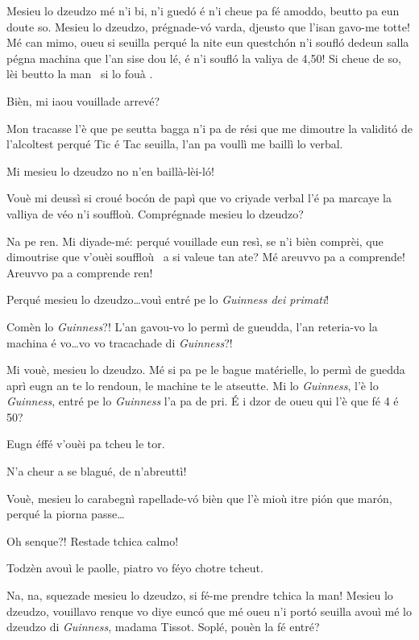 \begin{drama}
\Cienspeaks Mesieu lo dzeudzo mé n’i bi, n’i guedó é n’i cheue pa fé amoddo, beutto pa eun doute so. Mesieu lo dzeudzo, prégnade-v\'o varda, djeusto que l'isan gavo-me totte! Mé can mimo, oueu si seuilla perqué la nite eun questchón n’i soufló dedeun salla pégna machina que l’an sise dou lé, é n’i soufló la valiya de 4,50! Si cheue de so, lèi beutto la man \man\ si lo fouà \foua.

\DzeudzoSenliquerspeaks Bièn, mi iaou vouillade arrevé?

\Cienspeaks Mon tracasse l’è que pe seutta bagga n’i pa de rési que me dimoutre la validitó de l'alcoltest perqué Tic é Tac seuilla, l’an pa voullì me baillì lo verbal.

\Ticspeaks Mi mesieu lo dzeudzo no n’en baillà-lèi-l\'o!

\Cienspeaks Vouè mi deussì si croué bocón de papì que vo criyade verbal l'é pa marcaye la valliya de véo n’i souffloù. Comprégnade mesieu lo dzeudzo?

\DzeudzoSenliquerspeaks Na pe ren. Mi diyade-mé: perqué vouillade eun resì, se n’i bièn comprèi, que dimoutrise que v'ouèi souffloù \soffiare\ a si valeue tan ate? Mé areuvvo pa a comprende! Areuvvo pa a comprende ren!

\Cienspeaks Perqué mesieu lo dzeudzo\ldots vouì entré pe lo  \textit{Guinness dei primati}!

\DzeudzoSenliquerspeaks Comèn lo \textit{Guinness}?!  L'an gavou-vo lo permì de gueudda, l'an reteria-vo la machina é vo\ldots vo vo tracachade di \textit{Guinness}?!

\Cienspeaks Mi vouè, mesieu lo dzeudzo. Mé si pa pe le bague matérielle, lo permì de guedda aprì eugn an te lo rendoun, le machine te le atseutte. Mi lo \textit{Guinness}, l'è lo \textit{Guinness}, entré pe lo \textit{Guinness} l'a pa de pri. É i dzor de oueu qui l'è que fé 4 é 50?

\DzeudzoSenliquerspeaks Eugn éffé v'ouèi pa tcheu le tor.

\Ticspeaks N'a cheur a se blagué, de n’abreuttì!

\Cienspeaks Vouè, mesieu lo carabegnì rapellade-v\'o bièn que l'è mioù itre pi\'on que marón, perqué la piorna passe\ldots

\Ticspeaks {} Oh senque?! Restade tchica calmo!

\DzeudzoSenliquerspeaks {} Todzèn avouì le paolle, piatro vo féyo chotre tcheut.

\Cienspeaks Na, na, squezade mesieu lo dzeudzo, si fé-me prendre tchica la man! Mesieu lo dzeudzo, vouillavo renque vo diye eunc\'o que mé oueu n’i portó seuilla avouì mé lo dzeudzo di \textit{Guinness}, madama Tissot. Soplé, pouèn la fé entré?


\end{drama}
